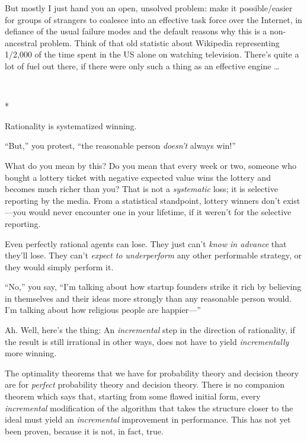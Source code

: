 {
 But mostly I just hand you an open, unsolved problem: make it
possible/easier for groups of strangers to coalesce into an effective
task force over the Internet, in defiance of the usual failure modes
and the default reasons why this is a non-ancestral problem. Think of
that old statistic about Wikipedia representing 1/2,000 of the time
spent in the US alone on watching television. There's
quite a lot of fuel out there, if there were only such a thing as an
effective engine \ldots}

{\centering
 \ ~
\par}

{\centering
 *
\par}


{
 Rationality is systematized winning. }

{
 ``But,'' you protest,
``the reasonable person
\textit{doesn't} always win!''}

{
 What do you mean by this? Do you mean that every week or two,
someone who bought a lottery ticket with negative expected value wins
the lottery and becomes much richer than you? That is not a
\textit{systematic} loss; it is selective reporting by the media. From
a statistical standpoint, lottery winners don't
exist---you would never encounter one in your lifetime, if it
weren't for the selective reporting.}

{
 Even perfectly rational agents can lose. They just
can't \textit{know in advance} that
they'll lose. They can't \textit{expect
to underperform} any other performable strategy, or they would simply
perform it.}

{
 ``No,'' you say,
``I'm talking about how startup
founders strike it rich by believing in themselves and their ideas more
strongly than any reasonable person would. I'm talking
about how religious people are happier---''}

{
 Ah. Well, here's the thing: An
\textit{incremental} step in the direction of rationality, if the
result is still irrational in other ways, does not have to yield
\textit{incrementally} more winning.}

{
 The optimality theorems that we have for probability theory and
decision theory are for \textit{perfect} probability theory and
decision theory. There is no companion theorem which says that,
starting from some flawed initial form, every \textit{incremental}
modification of the algorithm that takes the structure closer to the
ideal must yield an \textit{incremental} improvement in performance.
This has not yet been proven, because it is not, in fact, true.}

